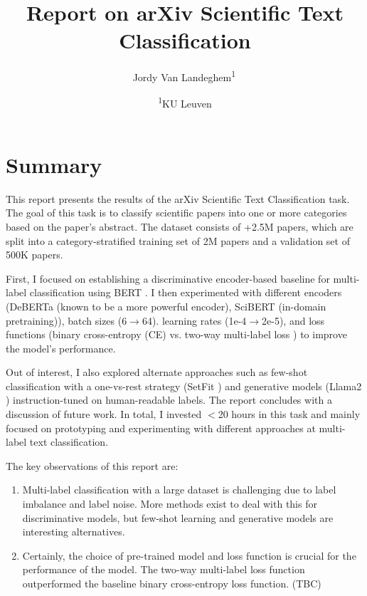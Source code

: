 \documentclass[11pt,letterpaper]{article}
\begin{document}
\title{Report on arXiv Scientific Text Classification} %

\newcommand{\superaffil}[2]{\textsuperscript{#1}\,#2}

\author{
  \small Jordy Van Landeghem\superaffil{1}
  \and
  \footnotesize{
    \textsuperscript{1}KU Leuven
  }
}

\maketitle

\section{Summary}

This report presents the results of the arXiv Scientific Text Classification task. The goal of this task is to classify scientific papers into one or more categories based on the paper's abstract. The dataset consists of +2.5M papers, which are split into a category-stratified training set of 2M papers and a validation set of 500K papers.

First, I focused on establishing a discriminative encoder-based baseline for multi-label classification using BERT \cite{devlin2018bert}.
I then experimented with different encoders (DeBERTa \cite{he2020deberta} (known to be a more powerful encoder), SciBERT \cite{maheshwari2021scibert} (in-domain pretraining)), batch sizes (6$\to$64). learning rates (1e-4$\to$2e-5), and loss functions (binary cross-entropy (CE) vs. two-way multi-label loss \cite{kobayashi2023two}) to improve the model's performance.

Out of interest, I also explored alternate approaches such as few-shot classification with a one-vs-rest strategy (SetFit \cite{tunstall2022efficient}) and generative models (Llama2 \cite{touvron2023llama}) instruction-tuned on human-readable labels. The report concludes with a discussion of future work. In total, I invested $<$20 hours in this task and mainly focused on prototyping and experimenting with different approaches at multi-label text classification.

\noindent The key observations of this report are:
\begin{enumerate}
  [label=\Roman*.,leftmargin=2\parindent]
  \item Multi-label classification with a large dataset is challenging due to label imbalance and label noise. More methods exist to deal with this for discriminative models, but few-shot learning and generative models are interesting alternatives.
  \item Certainly, the choice of pre-trained model and loss function is crucial for the performance of the model. The two-way multi-label loss function outperformed the baseline binary cross-entropy loss function. (TBC)
\end{enumerate}
\end{document}

